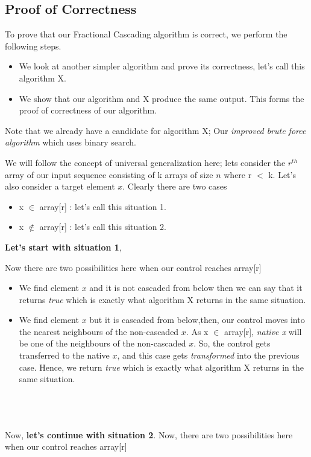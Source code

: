 \documentclass[11pt]{article}
\begin{document}
\pagebreak

\subsection{Proof of Correctness}
To prove that our Fractional Cascading algorithm is correct, we perform the following steps.
\begin{itemize}
    \item We look at another simpler algorithm and prove its correctness, let's call this algorithm X.
    \item We show that our algorithm and X produce the same output. This forms the proof of correctness of our algorithm.
\end{itemize}

Note that we already have a candidate for algorithm X; Our \textit{improved brute force algorithm} which uses binary search.


We will follow the concept of universal generalization here; lets consider the $r^{th}$ array of our input sequence consisting of k arrays of size $n$ where r $<$ k. Let's also consider a target element $x$. Clearly there are two cases
\begin{itemize}
    \item x $\in$ array[r] : let's call this situation 1.
     \item x $\notin$ array[r] : let's call this situation 2.
\end{itemize}

\textbf{Let's start with situation 1}, 

Now there are two possibilities here when our control reaches array[r] 
\begin{itemize}
    \item We find element $x$ and it is not cascaded from below then we can say that it returns \textit{true} which is exactly what algorithm X returns in the same situation.
    \item We find element $x$ but it is cascaded from below,then, our control moves into the nearest neighbours of the non-cascaded $x$. As x $\in$ array[r], \textit{native x} will be one of the neighbours of the non-cascaded $x$. So, the control gets transferred to the native $x$, and this case gets \textit{transformed} into the previous case. Hence, we return \textit{true} which is exactly what algorithm X returns in the same situation.
\end{itemize} \\ \\ \\
Now, \textbf{let's continue with situation 2}.
Now, there are two possibilities here when our control reaches array[r] 
\end{document}
